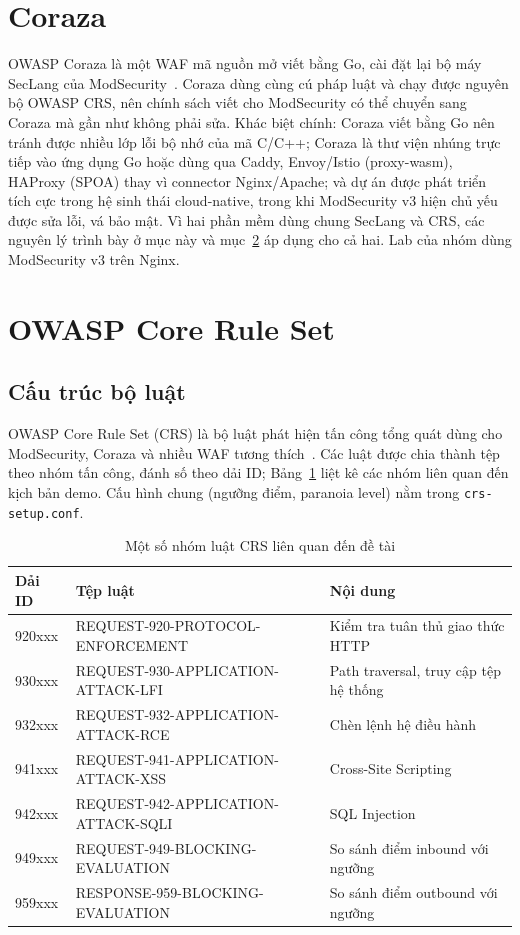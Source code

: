 \section{Coraza}
OWASP Coraza là một WAF mã nguồn mở viết bằng Go, cài đặt lại bộ máy SecLang của ModSecurity~\cite{coraza}. Coraza dùng cùng cú pháp luật và chạy được nguyên bộ OWASP CRS, nên chính sách viết cho ModSecurity có thể chuyển sang Coraza mà gần như không phải sửa. Khác biệt chính: Coraza viết bằng Go nên tránh được nhiều lớp lỗi bộ nhớ của mã C/C++; Coraza là thư viện nhúng trực tiếp vào ứng dụng Go hoặc dùng qua Caddy, Envoy/Istio (proxy-wasm), HAProxy (SPOA) thay vì connector Nginx/Apache; và dự án được phát triển tích cực trong hệ sinh thái cloud-native, trong khi ModSecurity v3 hiện chủ yếu được sửa lỗi, vá bảo mật.
Vì hai phần mềm dùng chung SecLang và CRS, các nguyên lý trình bày ở mục này và mục~\ref{sec:crs} áp dụng cho cả hai. Lab của nhóm dùng ModSecurity v3 trên Nginx.

\section{OWASP Core Rule Set}\label{sec:crs}
\subsection{Cấu trúc bộ luật}
OWASP Core Rule Set (CRS) là bộ luật phát hiện tấn công tổng quát dùng cho ModSecurity, Coraza và nhiều WAF tương thích~\cite{crs}. Các luật được chia thành tệp theo nhóm tấn công, đánh số theo dải ID; Bảng~\ref{tab:crsfiles} liệt kê các nhóm liên quan đến kịch bản demo. Cấu hình chung (ngưỡng điểm, paranoia level) nằm trong \texttt{crs-setup.conf}.

\begin{table}[!htb]
\centering
\caption{Một số nhóm luật CRS liên quan đến đề tài}
\label{tab:crsfiles}
\small
\begin{tabularx}{\linewidth}{@{}llX@{}}
\toprule
\textbf{Dải ID} & \textbf{Tệp luật} & \textbf{Nội dung} \\ \midrule
920xxx & REQUEST-920-PROTOCOL-ENFORCEMENT & Kiểm tra tuân thủ giao thức HTTP \\
930xxx & REQUEST-930-APPLICATION-ATTACK-LFI & Path traversal, truy cập tệp hệ thống \\
932xxx & REQUEST-932-APPLICATION-ATTACK-RCE & Chèn lệnh hệ điều hành \\
941xxx & REQUEST-941-APPLICATION-ATTACK-XSS & Cross-Site Scripting \\
942xxx & REQUEST-942-APPLICATION-ATTACK-SQLI & SQL Injection \\
949xxx & REQUEST-949-BLOCKING-EVALUATION & So sánh điểm inbound với ngưỡng \\
959xxx & RESPONSE-959-BLOCKING-EVALUATION & So sánh điểm outbound với ngưỡng \\
\bottomrule
\end{tabularx}
\end{table}

